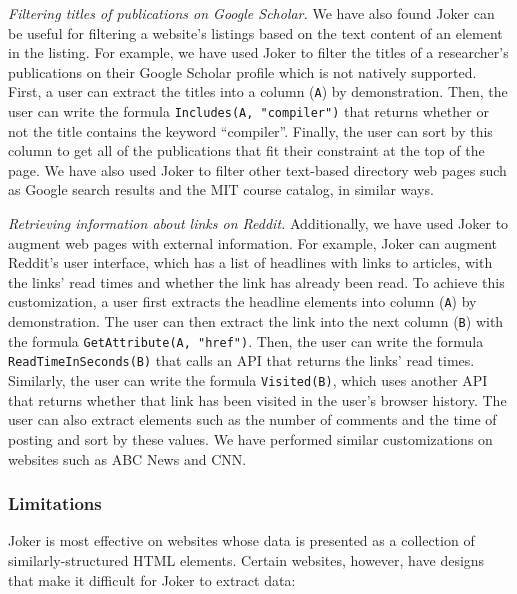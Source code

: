 \documentclass[conference]{IEEEtran}
\begin{document}
\emph{Filtering titles of publications on Google Scholar.} We have also
found Joker can be useful for filtering a website's listings based on
the text content of an element in the listing. For example, we have used
Joker to filter the titles of a researcher's publications on their
Google Scholar profile which is not natively supported. First, a user
can extract the titles into a column (\texttt{A}) by demonstration.
Then, the user can write the formula \texttt{Includes(A,\ "compiler")}
that returns whether or not the title contains the keyword ``compiler''.
Finally, the user can sort by this column to get all of the publications
that fit their constraint at the top of the page. We have also used
Joker to filter other text-based directory web pages such as Google
search results and the MIT course catalog, in similar ways.

\emph{Retrieving information about links on Reddit.} Additionally, we
have used Joker to augment web pages with external information. For
example, Joker can augment Reddit's user interface, which has a list of
headlines with links to articles, with the links' read times and whether
the link has already been read. To achieve this customization, a user
first extracts the headline elements into column (\texttt{A}) by
demonstration. The user can then extract the link into the next column
(\texttt{B}) with the formula \texttt{GetAttribute(A,\ "href")}. Then,
the user can write the formula \texttt{ReadTimeInSeconds(B)} that calls
an API that returns the links' read times. Similarly, the user can write
the formula \texttt{Visited(B)}, which uses another API that returns
whether that link has been visited in the user's browser history. The
user can also extract elements such as the number of comments and the
time of posting and sort by these values. We have performed similar
customizations on websites such as ABC News and CNN.

\hypertarget{limitations}{%
\subsubsection{Limitations}\label{limitations}}

Joker is most effective on websites whose data is presented as a
collection of similarly-structured HTML elements. Certain websites,
however, have designs that make it difficult for Joker to extract data:
\end{document}

